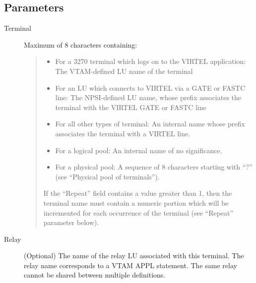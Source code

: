 \documentclass[letterpaper,10pt,english]{sphinxmanual}
\begin{document}
\subsection{Parameters}
\label{\detokenize{connectivity_guide:index-100}}\label{\detokenize{connectivity_guide:id53}}\begin{description}
\item[{Terminal}] \leavevmode
Maximum of 8 characters containing:
\begin{quote}
\begin{itemize}
\item {} 
For a 3270 terminal which logs on to the VIRTEL application: The VTAM-defined LU name of the terminal

\item {} 
For an LU which connects to VIRTEL via a GATE or FASTC line: The NPSI-defined LU name, whose prefix associates the terminal with the VIRTEL GATE or FASTC line

\item {} 
For all other types of terminal: An internal name whose prefix associates the terminal with a VIRTEL line.

\item {} 
For a logical pool: An internal name of no significance.

\item {} 
For a physical pool: A sequence of 8 characters starting with “?” (see “Physical pool of terminals”).

\end{itemize}

If the “Repeat” field contains a value greater than 1, then the terminal name must contain a numeric portion which will be incremented for each occurrence of the terminal (see “Repeat” parameter below).
\end{quote}

\item[{Relay}] \leavevmode
(Optional) The name of the relay LU associated with this terminal. The relay name corresponds to a VTAM APPL statement. The same relay cannot be shared between multiple definitions.


\end{description}
\end{document}
